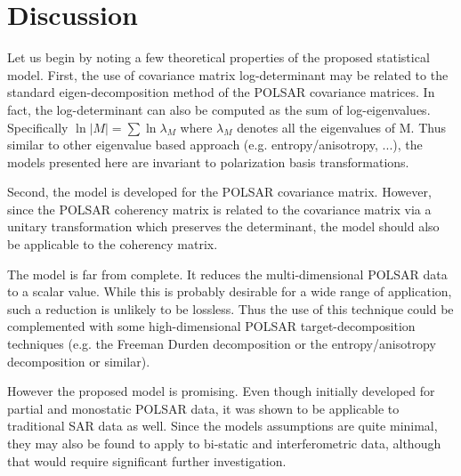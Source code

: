 \documentclass[journal]{IEEEtran}
\begin{document}

\section{Discussion}
\label{sec:discussion}

Let us begin by noting a few theoretical properties of the proposed statistical model.
First, the use of covariance matrix log-determinant may be related to the standard eigen-decomposition method of the POLSAR covariance matrices.
In fact, the log-determinant can also be computed as the sum of log-eigenvalues.
Specifically $\ln{|M|} = \sum \ln{\lambda_M}$ where $\lambda_M$ denotes all the eigenvalues of M.
Thus similar to other eigenvalue based approach (e.g. entropy/anisotropy, ...),
  the models presented here are invariant to polarization basis transformations.

Second, the model is developed for the POLSAR covariance matrix.
However, since the POLSAR coherency matrix is related to the covariance matrix via a unitary transformation which preserves the determinant,
  the model should also be applicable to the coherency matrix.

The model is far from complete.
 It reduces the multi-dimensional POLSAR data to a scalar value.
While this is probably desirable for a wide range of application,
  such a reduction is unlikely to be lossless.
Thus %
the use of this technique could be complemented with some high-dimensional POLSAR target-decomposition techniques (e.g. the Freeman Durden decomposition \cite{Freeman_1998_TGRS_963} or the entropy/anisotropy decomposition \cite{Cloude_1997_TGRS_68} or similar).

However the proposed model is promising.
Even though initially developed for partial and monostatic POLSAR data,
  it was shown to be applicable to traditional SAR data as well.
Since the models assumptions are quite minimal, they may also be found to apply to bi-static and interferometric data, although that would require significant further investigation.
\end{document}
